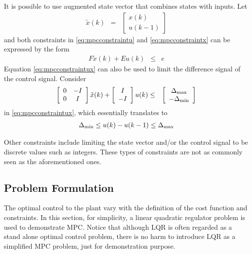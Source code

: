 It is possible to use augmented state vector that combines states with inputs. Let
\begin{eqnarray}
	\tilde{x}(k) &=& \left[\begin{array}{c}
	x(k) \\ u(k-1)
\end{array}\right] \nonumber
\end{eqnarray}
and both constraints in \eqref{eq:mpcconstraintu} and \eqref{eq:mpcconstraintx} can be expressed by the form
\begin{eqnarray}
	F\tilde{x}(k) + Eu(k) &\leq& e \label{eq:mpcconstraintux}
\end{eqnarray}
Equation \eqref{eq:mpcconstraintux} can also be used to limit the difference signal of the control signal. Consider
\begin{eqnarray}
	\left[\begin{array}{cc}
		0 & -I \\ 0 & I
	\end{array}\right]\tilde{x}(k) + \left[\begin{array}{c}
		I \\ -I
	\end{array}\right]u(k) &\leq& \left[\begin{array}{c}
		\Delta_{\textup{max}} \\ -\Delta_{\textup{min}}
	\end{array}\right] \nonumber
\end{eqnarray}
in \eqref{eq:mpcconstraintux}, which essentially translates to
\begin{eqnarray}
	\Delta_{\textup{min}} \leq u(k) - u(k-1) \leq \Delta_{\textup{max}} \nonumber
\end{eqnarray}

Other constraints include limiting the state vector and/or the control signal to be discrete values such as integers. These types of constraints are not as commonly seen as the aforementioned ones.

\subsection{Problem Formulation}

The optimal control to the plant vary with the definition of the cost function and constraints. In this section, for simplicity, a linear quadratic regulator problem is used to demonstrate MPC. Notice that although LQR is often regarded as a stand alone optimal control problem, there is no harm to introduce LQR as a simplified MPC problem, just for demonstration purpose.

